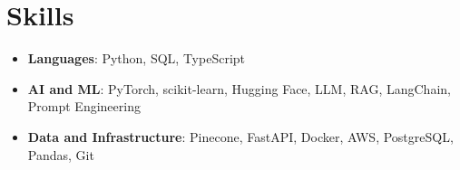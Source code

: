 \documentclass[letterpaper,11pt]{article}
\begin{document}
\section*{Skills}
\begin{itemize}[leftmargin=0.15in, label={}]
  \item \textbf{Languages}{: Python, SQL, TypeScript}
  \item \textbf{AI and ML}{: PyTorch, scikit-learn, Hugging Face, LLM, RAG, LangChain, Prompt Engineering} %
  \item \textbf{Data and Infrastructure}{: Pinecone, FastAPI, Docker, AWS, PostgreSQL, Pandas, Git}
\end{itemize}
\end{document}
